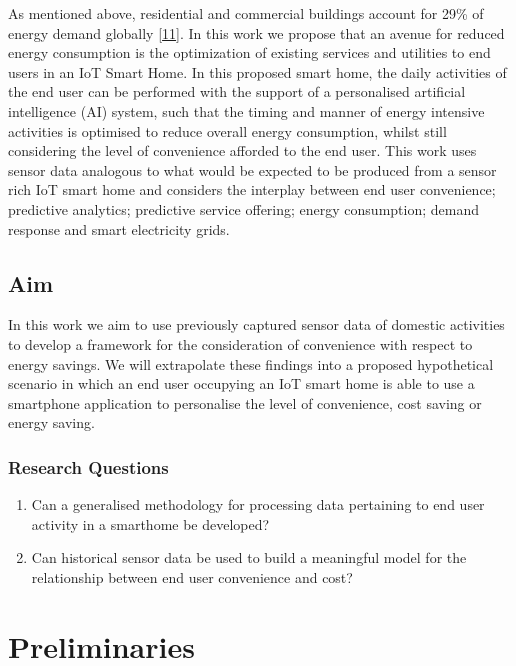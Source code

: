 \documentclass[11pt,]{article}
\providecommand{\tightlist}{%
  \setlength{\itemsep}{0pt}\setlength{\parskip}{0pt}}
\begin{document}
As mentioned above, residential and commercial buildings account for
29\% of energy demand globally
{[}\protect\hyperlink{ref-Consumption}{11}{]}. In this work we propose
that an avenue for reduced energy consumption is the optimization of
existing services and utilities to end users in an IoT Smart Home. In
this proposed smart home, the daily activities of the end user can be
performed with the support of a personalised artificial intelligence
(AI) system, such that the timing and manner of energy intensive
activities is optimised to reduce overall energy consumption, whilst
still considering the level of convenience afforded to the end user.
This work uses sensor data analogous to what would be expected to be
produced from a sensor rich IoT smart home and considers the interplay
between end user convenience; predictive analytics; predictive service
offering; energy consumption; demand response and smart electricity
grids.

\hypertarget{aim}{%
\subsection{Aim}\label{aim}}

In this work we aim to use previously captured sensor data of domestic
activities to develop a framework for the consideration of convenience
with respect to energy savings. We will extrapolate these findings into
a proposed hypothetical scenario in which an end user occupying an IoT
smart home is able to use a smartphone application to personalise the
level of convenience, cost saving or energy saving.

\hypertarget{research-questions}{%
\subsubsection{Research Questions}\label{research-questions}}

\begin{enumerate}
\def\labelenumi{\arabic{enumi}.}
\tightlist
\item
  Can a generalised methodology for processing data pertaining to end
  user activity in a smarthome be developed?
\item
  Can historical sensor data be used to build a meaningful model for the
  relationship between end user convenience and cost?
\end{enumerate}

\hypertarget{preliminaries}{%
\section{Preliminaries}\label{preliminaries}}
\end{document}
